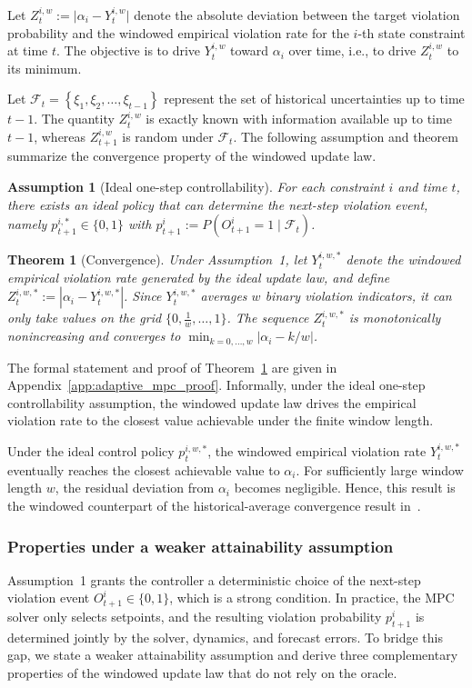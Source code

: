 \documentclass[a4paper,fleqn]{cas-dc}
\theoremstyle{plain}
\newtheorem{theorem}{Theorem}
\newtheorem{assumption}{Assumption}
\theoremstyle{remark}
\theoremstyle{plain}
\begin{document}
Let $Z_t^{i,w} := \vert \alpha_i - Y_t^{i,w} \vert$ denote the absolute deviation between the target violation probability and the windowed empirical violation rate for the $i$-th state constraint at time $t$. The objective is to drive $Y_t^{i,w}$ toward $\alpha_i$ over time, i.e., to drive $Z_t^{i,w}$ to its minimum.

Let $\mathcal{F}_t = \left\{\xi_1, \xi_2, \dots, \xi_{t-1}\right\}$ represent the set of historical uncertainties up to time $t-1$. The quantity $Z_t^{i,w}$ is exactly known with information available up to time $t-1$, whereas $Z_{t+1}^{i,w}$ is random under $\mathcal{F}_t$. The following assumption and theorem summarize the convergence property of the windowed update law.

\begin{assumption}[Ideal one-step controllability]
For each constraint $i$ and time $t$, there exists an ideal policy that can determine the next-step violation event, namely $p_{t+1}^{i,*}\in\{0,1\}$ with $p_{t+1}^i:=P(O_{t+1}^i=1\mid \mathcal{F}_t)$.
\end{assumption}

\begin{theorem}[Convergence]\label{thm:window_conv}
Under Assumption~1, let $Y_t^{i,w,*}$ denote the windowed empirical violation rate generated by the ideal update law, and define $Z_t^{i,w,*}:=|\alpha_i-Y_t^{i,w,*}|$. Since $Y_t^{i,w,*}$ averages $w$ binary violation indicators, it can only take values on the grid $\{0,\tfrac{1}{w},\ldots,1\}$. The sequence $Z_t^{i,w,*}$ is monotonically nonincreasing and converges to $\min_{k=0,\ldots,w}|\alpha_i-k/w|$.
\end{theorem}

The formal statement and proof of Theorem~\ref{thm:window_conv} are given in Appendix~\ref{app:adaptive_mpc_proof}. Informally, under the ideal one-step controllability assumption, the windowed update law drives the empirical violation rate to the closest value achievable under the finite window length.

Under the ideal control policy $p_t^{i,w,*}$, the windowed empirical violation rate $Y_t^{i,w,*}$ eventually reaches the closest achievable value to $\alpha_i$. For sufficiently large window length $w$, the residual deviation from $\alpha_i$ becomes negligible. Hence, this result is the windowed counterpart of the historical-average convergence result in~\cite{ghosh2025_adaptive_relaxation_ccsmpc}.

\subsubsection*{Properties under a weaker attainability assumption}
Assumption~1 grants the controller a deterministic choice of the next-step violation event $O_{t+1}^i\in\{0,1\}$, which is a strong condition. In practice, the MPC solver only selects setpoints, and the resulting violation probability $p_{t+1}^i$ is determined jointly by the solver, dynamics, and forecast errors. To bridge this gap, we state a weaker attainability assumption and derive three complementary properties of the windowed update law that do not rely on the oracle.
\end{document}
